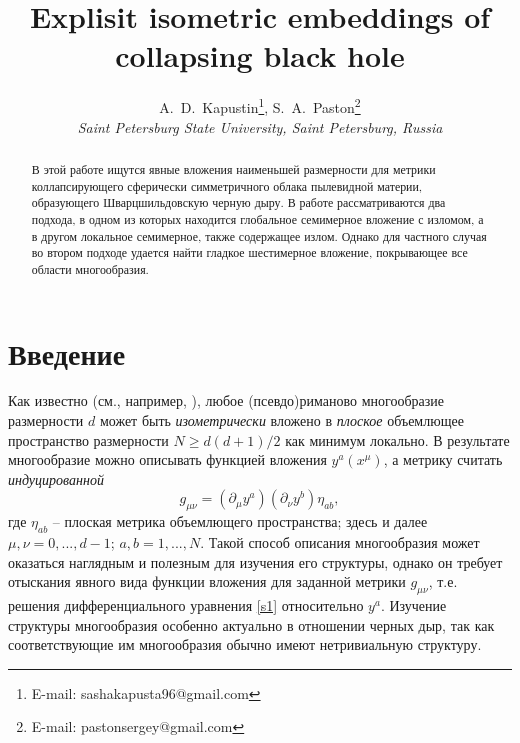 \documentclass[12pt]{article}
\newcommand{\bq}{\begin{equation}}
\newcommand{\eq}{\end{equation}}
\begin{document}
\title{Explisit isometric embeddings of collapsing black hole}
\author{
A.~D.~Kapustin\thanks{E-mail: sashakapusta96@gmail.com},
S.~A.~Paston\thanks{E-mail: pastonsergey@gmail.com}\\
{\it Saint Petersburg State University, Saint Petersburg, Russia}
}
\date{\vskip 15mm}
\maketitle

\begin{abstract}
В этой работе ищутся явные вложения наименьшей размерности для метрики коллапсирующего сферически симметричного облака пылевидной материи, образующего Шварцшильдовскую черную дыру. В работе рассматриваются два подхода, в одном из которых находится глобальное семимерное вложение с изломом, а в другом локальное семимерное, также содержащее излом. Однако для частного случая во втором подходе удается найти гладкое шестимерное вложение, покрывающее все области многообразия.
\end{abstract}

\clearpage

\section{Введение}
Как известно (см., например, \cite{goenner}), любое (псевдо)риманово многообразие размерности $d$ может быть \emph{изометрически} вложено в \emph{плоское} объемлющее пространство размерности $N \geqslant d(d+1)/2$ как минимум локально.
В результате многообразие можно описывать функцией вложения $y^a(x^\mu)$, а метрику считать \emph{индуцированной}
\bq\label{s1}
	g_{\mu \nu} = (\partial_{\mu} y^a) (\partial_{\nu} y^b) \eta_{ab},
\eq
где $\eta_{ab}$ -- плоская метрика объемлющего пространства; здесь и далее $\mu,\nu=0,...,d-1$; $a,b=1,...,N$.
Такой способ описания многообразия может оказаться наглядным и полезным для изучения его структуры, однако он требует отыскания явного вида функции вложения для заданной метрики $g_{\mu\nu}$, т.е. решения дифференциального уравнения \eqref{s1} относительно $y^a$. Изучение структуры многообразия особенно актуально в отношении черных дыр, так как соответствующие им многообразия обычно имеют нетривиальную структуру.
 
\end{document}
